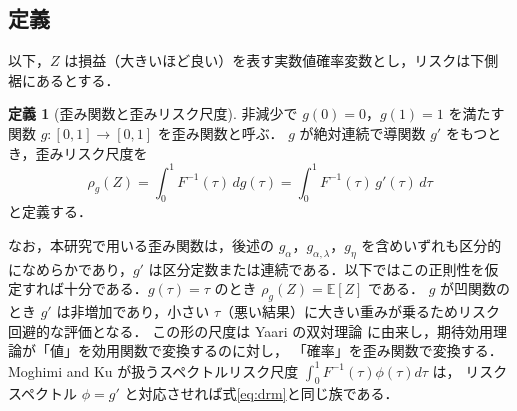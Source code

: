 \documentclass[a4paper,10pt]{jsarticle}
\theoremstyle{definition}
\newtheorem{definition}{定義}[section]
\newcommand{\Finv}{F^{-1}}
\newcommand{\E}{\mathbb{E}}
\begin{document}
\subsection{定義}
以下，$Z$ は損益（大きいほど良い）を表す実数値確率変数とし，リスクは下側裾にあるとする．
\begin{definition}[歪み関数と歪みリスク尺度]
非減少で $g(0)=0$，$g(1)=1$ を満たす関数 $g:[0,1]\to[0,1]$ を歪み関数と呼ぶ．
$g$ が絶対連続で導関数 $g'$ をもつとき，歪みリスク尺度を
\begin{equation}
  \rho_g(Z)=\int_0^1\Finv(\tau)\,dg(\tau)=\int_0^1\Finv(\tau)\,g'(\tau)\,d\tau
  \label{eq:drm}
\end{equation}
と定義する．
\end{definition}
なお，本研究で用いる歪み関数は，後述の $g_\alpha$，$g_{\alpha,\lambda}$，$g_\eta$ を含めいずれも区分的になめらかであり，$g'$ は区分定数または連続である．以下ではこの正則性を仮定すれば十分である．$g(\tau)=\tau$ のとき $\rho_g(Z)=\E[Z]$ である．
$g$ が凹関数のとき $g'$ は非増加であり，小さい $\tau$（悪い結果）に大きい重みが乗るためリスク回避的な評価となる．
この形の尺度は Yaari の双対理論 \cite{yaari1987dual} に由来し，期待効用理論が「値」を効用関数で変換するのに対し，
「確率」を歪み関数で変換する．
Moghimi and Ku \cite{moghimi2025beyond} が扱うスペクトルリスク尺度 $\int_0^1\Finv(\tau)\phi(\tau)d\tau$ は，
リスクスペクトル $\phi=g'$ と対応させれば式\eqref{eq:drm}と同じ族である．
\end{document}

